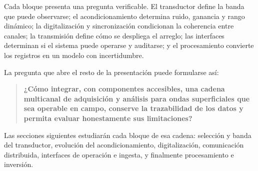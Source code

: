 Cada bloque presenta una pregunta verificable. El transductor define la banda que puede
observarse; el acondicionamiento determina ruido, ganancia y rango dinámico; la
digitalización y sincronización condicionan la coherencia entre canales; la transmisión
define cómo se despliega el arreglo; las interfaces determinan si el sistema puede
operarse y auditarse; y el procesamiento convierte los registros en un modelo con
incertidumbre.

La pregunta que abre el resto de la presentación puede formularse así:

\begin{quote}
\textbf{¿Cómo integrar, con componentes accesibles, una cadena multicanal de
adquisición y análisis para ondas superficiales que sea operable en campo, conserve la
trazabilidad de los datos y permita evaluar honestamente sus limitaciones?}
\end{quote}

Las secciones siguientes estudiarán cada bloque de esa cadena: selección y banda del
transductor, evolución del acondicionamiento, digitalización, comunicación distribuida,
interfaces de operación e ingesta, y finalmente procesamiento e inversión.

